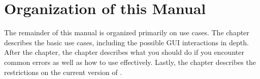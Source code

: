 \documentclass[main.tex]{subfiles}
\begin{document}
\section{Organization of this Manual}

The remainder of this manual is organized primarily on use cases. The  chapter describes the basic use cases, including the possible GUI interactions in depth. After the  chapter, the  chapter describes what you should do if you encounter common errors as well as how to use \CC{} effectively. Lastly, the  chapter describes the restrictions on the current version of \CC.
\end{document}
